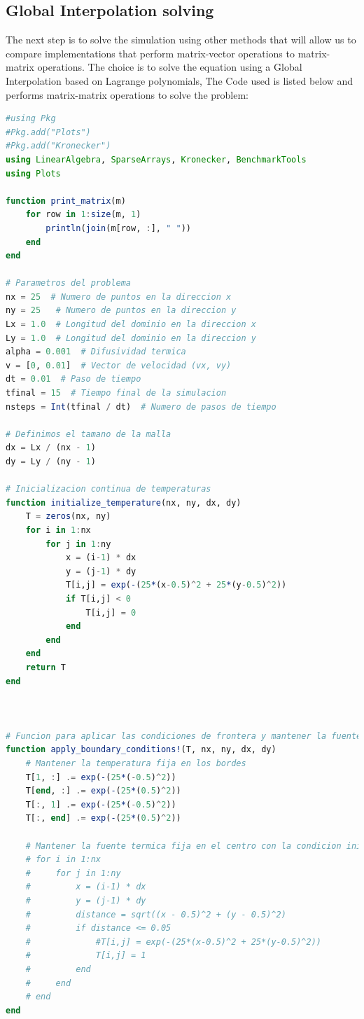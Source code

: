 \clearpage
\subsection{Global Interpolation solving}

The next step is to solve the simulation using other methods that will allow us to compare 
implementations that perform matrix-vector operations to matrix-matrix operations.
The choice is to solve the equation using a Global Interpolation based on Lagrange polynomials, The Code used is listed below and performs matrix-matrix operations to solve the problem: 


\begin{lstlisting}[language=Julia]
#using Pkg
#Pkg.add("Plots")
#Pkg.add("Kronecker")
using LinearAlgebra, SparseArrays, Kronecker, BenchmarkTools
using Plots

function print_matrix(m)
    for row in 1:size(m, 1)
        println(join(m[row, :], " "))
    end
end

# Parametros del problema
nx = 25  # Numero de puntos en la direccion x
ny = 25   # Numero de puntos en la direccion y
Lx = 1.0  # Longitud del dominio en la direccion x
Ly = 1.0  # Longitud del dominio en la direccion y
alpha = 0.001  # Difusividad termica
v = [0, 0.01]  # Vector de velocidad (vx, vy)
dt = 0.01  # Paso de tiempo
tfinal = 15  # Tiempo final de la simulacion
nsteps = Int(tfinal / dt)  # Numero de pasos de tiempo

# Definimos el tamano de la malla
dx = Lx / (nx - 1)
dy = Ly / (ny - 1)

# Inicializacion continua de temperaturas
function initialize_temperature(nx, ny, dx, dy)
    T = zeros(nx, ny)
    for i in 1:nx
        for j in 1:ny
            x = (i-1) * dx
            y = (j-1) * dy
            T[i,j] = exp(-(25*(x-0.5)^2 + 25*(y-0.5)^2))
            if T[i,j] < 0
                T[i,j] = 0
            end
        end
    end
    return T
end



# Funcion para aplicar las condiciones de frontera y mantener la fuente termica fija
function apply_boundary_conditions!(T, nx, ny, dx, dy)
    # Mantener la temperatura fija en los bordes
    T[1, :] .= exp(-(25*(-0.5)^2))
    T[end, :] .= exp(-(25*(0.5)^2))
    T[:, 1] .= exp(-(25*(-0.5)^2))
    T[:, end] .= exp(-(25*(0.5)^2))

    # Mantener la fuente termica fija en el centro con la condicion inicial
    # for i in 1:nx
    #     for j in 1:ny
    #         x = (i-1) * dx
    #         y = (j-1) * dy
    #         distance = sqrt((x - 0.5)^2 + (y - 0.5)^2)
    #         if distance <= 0.05
    #             #T[i,j] = exp(-(25*(x-0.5)^2 + 25*(y-0.5)^2))
    #             T[i,j] = 1
    #         end
    #     end
    # end
end




\end{lstlisting}
